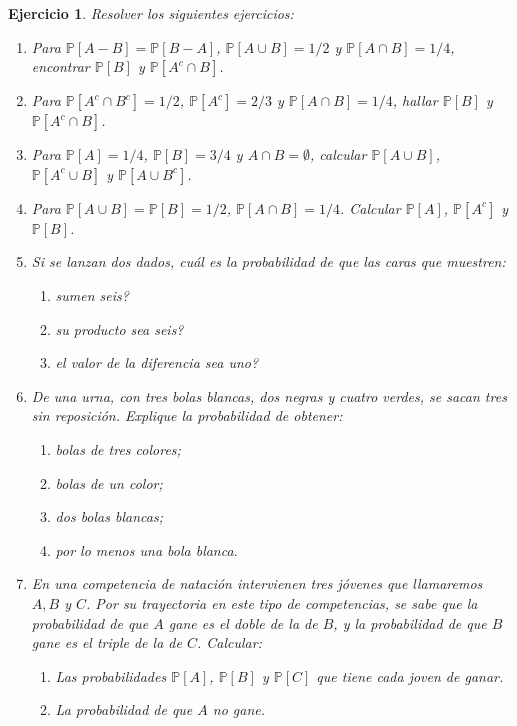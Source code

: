 \documentclass[12pt,twoside]{article}
\newtheorem{Ejer}{Ejercicio}
\newcommand{\Prob}{\mathbb{P}}
\begin{document}
\begin{Ejer} Resolver los siguientes ejercicios:
\begin{enumerate}

\item Para $\Prob\left[A-B\right]=\Prob\left[B-A\right]$, $\Prob\left[A\cup B\right]=1/2$ y $\Prob\left[A\cap B\right]=1/4$, encontrar $\Prob\left[B\right]$ y $\Prob\left[A^{c}\cap B\right]$.

\item Para $\Prob\left[A^{c}\cap B^{c}\right]=1/2$, $\Prob\left[A^{c}\right]=2/3$ y $\Prob\left[A\cap B\right]=1/4$, hallar $\Prob\left[B\right]$ y $\Prob\left[A^{c}\cap B\right]$.

\item Para $\Prob\left[A\right]=1/4$, $\Prob\left[B\right]=3/4$ y $A\cap B=\emptyset$, calcular $\Prob\left[A\cup B\right]$, $\Prob\left[A^{c}\cup B\right]$ y $\Prob\left[A\cup B^{c}\right]$.

\item Para $\Prob\left[A\cup B\right]=\Prob\left[B\right]=1/2$, $\Prob\left[A\cap B\right]=1/4$. Calcular $\Prob\left[A\right]$, $\Prob\left[A^{c}\right]$ y $\Prob\left[B\right]$.

\item Si se lanzan dos dados,  cu\'{a}l es la probabilidad de que las caras que muestren:
\begin{enumerate}
\item sumen seis?
\item su producto sea seis?
\item el valor de la diferencia sea uno?
\end{enumerate}

\item De una urna, con tres bolas blancas, dos negras y cuatro verdes, se sacan tres sin reposici\'{o}n. Explique la probabilidad de obtener:
\begin{enumerate}
\item bolas de tres colores;
\item bolas de un color;
\item dos bolas blancas;
\item por lo menos una bola blanca.
\end{enumerate}

\item En una competencia de nataci\'{o}n intervienen tres j\'{o}venes que llamaremos $A,B$ y $C$. Por su trayectoria en este tipo de competencias, se sabe que la probabilidad de que $A$ gane es el doble de la de $B$, y la probabilidad de que $B$ gane es el triple de la de $C$. Calcular:
\begin{enumerate}
\item Las probabilidades $\Prob\left[A\right]$, $\Prob\left[B\right]$ y $\Prob\left[C\right]$ que tiene cada joven de ganar.
\item La probabilidad de que $A$ no gane.


\end{enumerate}
\end{enumerate}
\end{Ejer}
\end{document}
